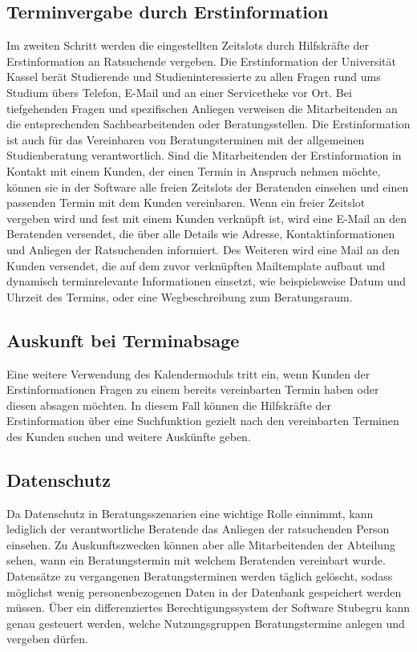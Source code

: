 \subsection*{Terminvergabe durch Erstinformation}
Im zweiten Schritt werden die eingestellten Zeitslots durch Hilfskräfte der
Erstinformation an Ratsuchende vergeben. Die Erstinformation der Universität
Kassel berät Studierende und Studieninteressierte zu allen Fragen rund ums
Studium übers Telefon, E-Mail und an einer Servicetheke vor Ort. Bei
tiefgehenden Fragen und spezifischen Anliegen verweisen die Mitarbeitenden an
die entsprechenden Sachbearbeitenden oder Beratungsstellen. Die Erstinformation
ist auch für das Vereinbaren von Beratungsterminen mit der allgemeinen
Studienberatung verantwortlich. Sind die Mitarbeitenden der Erstinformation in
Kontakt mit einem Kunden, der einen Termin in Anspruch nehmen möchte, können
sie in der Software alle freien Zeitslots der Beratenden einsehen und einen
passenden Termin mit dem Kunden vereinbaren. Wenn ein freier Zeitslot vergeben
wird und fest mit einem Kunden verknüpft ist, wird eine E-Mail an den Beratenden
versendet, die über alle Details wie Adresse, Kontaktinformationen und Anliegen
der Ratsuchenden informiert. Des Weiteren wird eine Mail an den Kunden
versendet, die auf dem zuvor verknüpften Mailtemplate aufbaut und dynamisch
terminrelevante Informationen einsetzt, wie beispielsweise Datum und Uhrzeit
des Termins, oder eine Wegbeschreibung zum Beratungsraum.

\subsection*{Auskunft bei Terminabsage}
Eine weitere Verwendung des Kalendermoduls tritt ein, wenn Kunden der
Erstinformationen Fragen zu einem bereits vereinbarten Termin haben oder diesen
absagen möchten. In diesem Fall können die Hilfskräfte der Erstinformation über
eine Suchfunktion gezielt nach den vereinbarten Terminen des Kunden suchen und
weitere Auskünfte geben.

\subsection*{Datenschutz}
Da Datenschutz in Beratungsszenarien eine wichtige Rolle einnimmt, kann
lediglich der verantwortliche Beratende das Anliegen der ratsuchenden Person
einsehen. Zu Auskunftszwecken können aber alle Mitarbeitenden der Abteilung
sehen, wann ein Beratungstermin mit welchem Beratenden vereinbart wurde.
Datensätze zu vergangenen Beratungsterminen werden täglich gelöscht, sodass
möglichst wenig personenbezogenen Daten in der Datenbank gespeichert werden
müssen. Über ein differenziertes Berechtigungssystem der Software Stubegru kann genau gesteuert werden, welche Nutzungsgruppen Beratungstermine anlegen
und vergeben dürfen.

